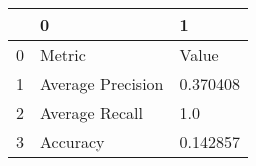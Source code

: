 \begin{tabular}{lll}
\toprule
{} &                  0 &         1 \\
\midrule
0 &             Metric &     Value \\
1 &  Average Precision &  0.370408 \\
2 &     Average Recall &       1.0 \\
3 &           Accuracy &  0.142857 \\
\bottomrule
\end{tabular}
